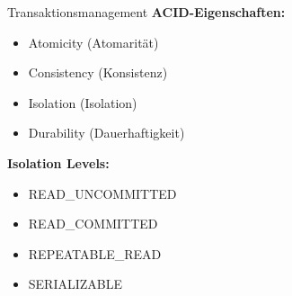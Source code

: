 
\begin{concept}{Transaktionsmanagement}
\textbf{ACID-Eigenschaften:}
\begin{itemize}
    \item Atomicity (Atomarität)
    \item Consistency (Konsistenz)
    \item Isolation (Isolation)
    \item Durability (Dauerhaftigkeit)
\end{itemize}

\textbf{Isolation Levels:}
\begin{itemize}
    \item READ_UNCOMMITTED
    \item READ_COMMITTED
    \item REPEATABLE_READ
    \item SERIALIZABLE
\end{itemize}
\end{concept}